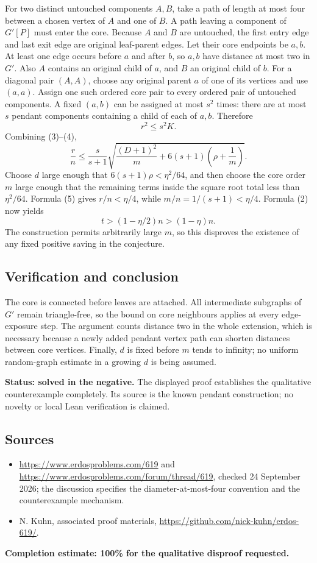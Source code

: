 For two distinct untouched components $A,B$, take a path of length at most four between a chosen vertex of $A$ and one of $B$. A path leaving a component of $G'[P]$ must enter the core. Because $A$ and $B$ are untouched, the first entry edge and last exit edge are original leaf-parent edges. Let their core endpoints be $a,b$. At least one edge occurs before $a$ and after $b$, so $a,b$ have distance at most two in $G'$. Also $A$ contains an original child of $a$, and $B$ an original child of $b$. For a diagonal pair $(A,A)$, choose any original parent $a$ of one of its vertices and use $(a,a)$.
Assign one such ordered core pair to every ordered pair of untouched components. A fixed $(a,b)$ can be assigned at most $s^2$ times: there are at most $s$ pendant components containing a child of each of $a,b$. Therefore
\[
 r^2\le s^2K. \tag{4}
\]
Combining (3)--(4),
\[
 \frac rn\le\frac{s}{s+1}
 \sqrt{\frac{(D+1)^2}{m}+6(s+1)\left(\rho+\frac1m\right)}.
 \tag{5}
\]
Choose $d$ large enough that $6(s+1)\rho<\eta^2/64$, and then choose the core order $m$ large enough that the remaining terms inside the square root total less than $\eta^2/64$. Formula (5) gives $r/n<\eta/4$, while $m/n=1/(s+1)<\eta/4$. Formula (2) now yields
\[
 \boxed{t>(1-\eta/2)n>(1-\eta)n.}
\]
The construction permits arbitrarily large $m$, so this disproves the existence of any fixed positive saving in the conjecture.

\subsection*{Verification and conclusion}
The core is connected before leaves are attached. All intermediate subgraphs of $G'$ remain triangle-free, so the bound on core neighbours applies at every edge-exposure step. The argument counts distance two in the whole extension, which is necessary because a newly added pendant vertex path can shorten distances between core vertices. Finally, $d$ is fixed before $m$ tends to infinity; no uniform random-graph estimate in a growing $d$ is being assumed.

\textbf{Status: solved in the negative.} The displayed proof establishes the qualitative counterexample completely. Its source is the known pendant construction; no novelty or local Lean verification is claimed.

\subsection*{Sources}
\begin{itemize}
\item \url{https://www.erdosproblems.com/619} and \url{https://www.erdosproblems.com/forum/thread/619}, checked 24 September 2026; the discussion specifies the diameter-at-most-four convention and the counterexample mechanism.
\item N. Kuhn, associated proof materials, \url{https://github.com/nick-kuhn/erdos-619/}.
\end{itemize}
\noindent\textbf{Completion estimate: 100\% for the qualitative disproof requested.}
